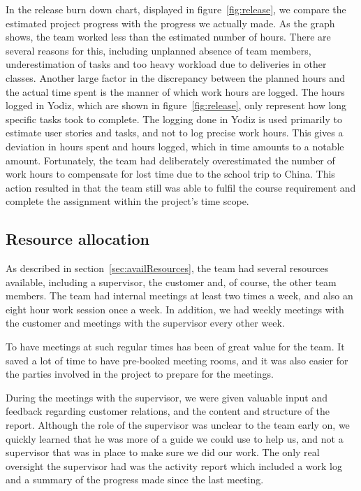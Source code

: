\noindent In the release burn down chart, displayed in figure~\ref{fig:release}, we compare the estimated project progress with the progress we actually made. As the graph shows, the team worked less than the estimated number of hours. There are several reasons for this, including unplanned absence of team members, underestimation of tasks and too heavy workload due to deliveries in other classes. Another large factor in the discrepancy between the planned hours and the actual time spent is the manner of which work hours are logged. The hours logged in Yodiz, which are shown in figure~\ref{fig:release}, only represent how long specific tasks took to complete. The logging done in Yodiz is used primarily to estimate user stories and tasks, and not to log precise work hours. This gives a deviation in hours spent and hours logged, which in time amounts to a notable amount. Fortunately, the team had deliberately overestimated the number of work hours to compensate for lost time due to the school trip to China. This action resulted in that the team still was able to fulfil the course requirement and complete the assignment within the project's time scope.


\subsection{Resource allocation}
As described in section~\ref{sec:availResources}, the team had several resources available, including a supervisor, the customer and, of course, the other team members. The team had internal meetings at least two times a week, and also an eight hour work session once a week. In addition, we had weekly meetings with the customer and meetings with the supervisor every other week.

To have meetings at such regular times has been of great value for the team. It saved a lot of time to have pre-booked meeting rooms, and it was also easier for the parties involved in the project to prepare for the meetings.

During the meetings with the supervisor, we were given valuable input and feedback regarding customer relations, and the content and structure of the report. Although the role of the supervisor was unclear to the team early on, we quickly learned that he was more of a guide we could use to help us, and not a supervisor that was in place to make sure we did our work. The only real oversight the supervisor had was the activity report which included a work log and a summary of the progress made since the last meeting.


